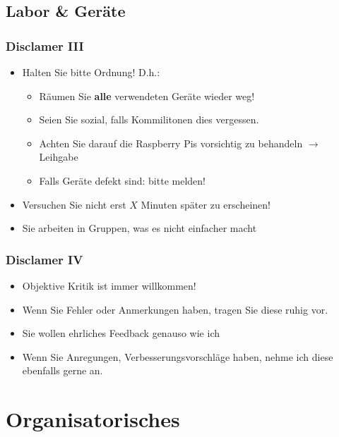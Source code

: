\documentclass[xcolor=dvipsnames,aspectratio=169]{beamer}
\begin{document}
\subsection{Labor \& Geräte}
\begin{frame}
	\frametitle{Disclamer III}
	\begin{itemize}
		\item Halten Sie bitte Ordnung! D.h.:
		\begin{itemize}
			\item Räumen Sie \textbf{alle} verwendeten Geräte wieder weg!
			\item Seien Sie sozial, falls Kommilitonen dies vergessen.
			\item Achten Sie darauf die Raspberry Pis vorsichtig zu behandeln $\rightarrow$ Leihgabe
			\item Falls Geräte defekt sind: bitte melden!
		\end{itemize}
		\item Versuchen Sie nicht erst $X$ Minuten später zu erscheinen! 
		\item Sie arbeiten in Gruppen, was es nicht einfacher macht
	\end{itemize}
\end{frame}

\begin{frame}
	\frametitle{Disclamer IV}
	\begin{itemize}
		\item Objektive Kritik ist immer willkommen!
		\item Wenn Sie Fehler oder Anmerkungen haben, tragen Sie diese ruhig vor.
		\item Sie wollen ehrliches Feedback genauso wie ich
		\item Wenn Sie Anregungen, Verbesserungsvorschläge haben, nehme ich diese ebenfalls gerne an.
	\end{itemize}
\end{frame}

\section{Organisatorisches}
\end{document}
